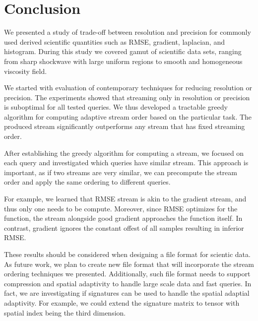 \section{Conclusion}
We presented a study of trade-off between resolution and precision for commonly used derived
scientific quantities such as RMSE, gradient, laplacian, and histogram. During this study we
covered gamut of scientific data sets, ranging from sharp shockwave with large uniform regions
to smooth and homogeneous viscosity field.

We started with evaluation of contemporary techniques for reducing resolution or precision.
The experiments showed that streaming only in resolution or precision is suboptimal for all
tested queries. We thus developed a tractable greedy algorithm for computing adaptive stream order
based on the particular task. The produced stream significantly outperforms any stream that has
fixed streaming order.

After establishing the greedy algorithm for computing a stream, we focused on each query and
investigated which queries have similar stream. This approach is important, as if two streams
are very similar, we can precompute the stream order and apply the same ordering to different
queries.

For example, we learned that RMSE stream is akin to the gradient stream, and thus only one
needs to be compute. Moreover, since RMSE optimizes for the function, the stream alongside
good gradient approaches the function itself. In contrast, gradient ignores the constant offest
of all samples resulting in inferior RMSE.


These results should be considered when designing a file format for scientic data. As future work,
we plan to create new file format that will incorporate the stream ordering techniques we presented.
Additionally, such file format needs to support compression and spatial adaptivity to handle large
scale data and fast queries. In fact, we are investigating if signatures can be used to handle
the spatial adaptial adaptivity. For example, we could extend the signature matrix to tensor with
spatial index being the third dimension.


%
%
%
%
%
%
%
